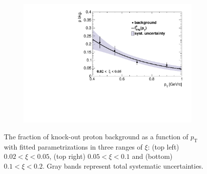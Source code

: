 \begin{figure}[h!]
\begin{subfigure}{.49\textwidth}
		\includegraphics[width=\textwidth,page=3]{chapters/chrgSTAR/img/DCAproton/p_bkg_summary.pdf}
	\end{subfigure}
	\begin{minipage}{.49\textwidth}
			\caption{The fraction of knock-out proton background  as a function of $p_\textrm{T}$   with  fitted parametrizations in three ranges of $\xi$: (top left) $0.02 < \xi < 0.05$, (top right) $0.05<\xi<0.1$ and (bottom) $0.1<\xi<0.2$. Gray bands represent total systematic uncertainties.}
			\label{fig:protonBkgSystSummary}
	\end{minipage}
\end{figure}


 
 \FloatBarrier